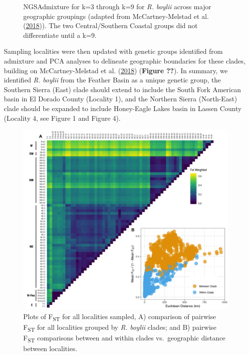\documentclass[proquest,12pt,final]{ucthesis-CA2012} %
\begin{document}
\begin{ucmainmatter}
\begin{figure}
{}

\caption{NGSAdmixture for k=3 through k=9 for \emph{R. boylii}
across major geographic groupings (adapted from McCartney-Melstad et al.
(\protect\hyperlink{ref-mccartney-melstad_population_2018}{2018})). The
two Central/Southern Coastal groups did not differentiate until a k=9.}\label{fig:CH3F3admix}
\end{figure}
Sampling localities were then updated with genetic groups identified
from admixture and PCA analyses to delineate geographic boundaries for
these clades, building on McCartney-Melstad et al.
(\protect\hyperlink{ref-mccartney-melstad_population_2018}{2018})
(\textbf{Figure ??}). In summary, we identified \emph{R. boylii} from
the Feather Basin as a unique genetic group, the Southern Sierra (East)
clade should extend to include the South Fork American basin in El
Dorado County (Locality 1), and the Northern Sierra (North-East) clade
should be expanded to include Honey-Eagle Lakes basin in Lassen County
(Locality 4, see Figure 1 and Figure 4).

\clearpage






\begin{figure}

{\centering \includegraphics[width=0.95\linewidth]{figure/ch3/fig_05_combined_fst_cowplot_annotated} 

}

\caption{Plots of F\textsubscript{ST} for all localities sampled,
A) comparison of pairwise F\textsubscript{ST} for all localities grouped
by \emph{R. boylii} clades; and B) pairwise F\textsubscript{ST}
comparisons between and within clades vs.~geographic distance between
localities.}\label{fig:CH3F5fst}
\end{figure}
\clearpage









\end{ucmainmatter}
\end{document}
